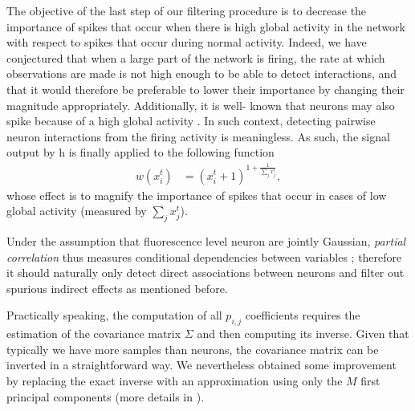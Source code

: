\documentclass[wcp]{jmlr}
\begin{document}
The objective of the last step of our filtering procedure is to decrease the
importance of spikes that occur when there is high global activity in the
network with respect to spikes that occur during normal activity. Indeed, we
have conjectured that when a large part of the network is firing, the rate at
which observations are made is not high enough to be able to detect
interactions, and that it would therefore be preferable to lower their
importance by changing their magnitude appropriately. Additionally, it is well-
known that neurons may also spike because of a high global activity
\citep{stetter2012model}. In such context, detecting pairwise neuron
interactions from the firing activity is meaningless. As such, the signal
output by h is finally applied to the following function
\begin{align}
 w(x^{t}_i) &= (x^{t}_i + 1 )^{1 + \frac{1}{\sum_{j} x^{t}_j}}, \label{eq:magnify-filter}
\end{align}
whose effect is to magnify the importance of spikes that occur in cases of low
global activity (measured by $\sum_j x^t_j$).

Under the assumption that fluorescence level neuron are jointly Gaussian,
\textit{partial correlation} thus measures conditional dependencies between
variables ; therefore it should naturally only detect direct associations
between neurons and filter out spurious indirect effects as mentioned before.

Practically speaking, the computation of all $p_{i,j}$ coefficients requires
the estimation of the covariance matrix $\Sigma$ and then computing its
inverse. Given that typically we have more samples than neurons, the covariance
matrix can be inverted in a straightforward way. We nevertheless obtained some
improvement by replacing the exact inverse with an approximation using only the
$M$ first principal components \citep{bishop2006pattern} (more details in
\citep{sutera2014simple}).
\end{document}
